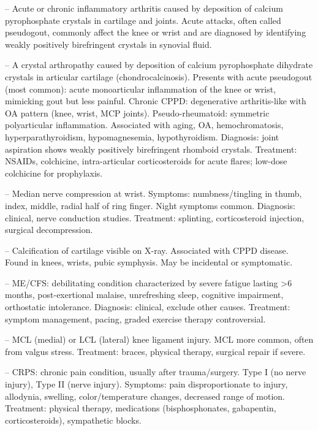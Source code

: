 -- Acute or chronic inflammatory arthritis caused by deposition of calcium pyrophosphate crystals in cartilage and joints. Acute attacks, often called pseudogout, commonly affect the knee or wrist and are diagnosed by identifying weakly positively birefringent crystals in synovial fluid.

-- A crystal arthropathy caused by deposition of calcium pyrophosphate dihydrate crystals in articular cartilage (chondrocalcinosis). Presents with acute pseudogout (most common): acute monoarticular inflammation of the knee or wrist, mimicking gout but less painful. Chronic CPPD: degenerative arthritis-like with OA pattern (knee, wrist, MCP joints). Pseudo-rheumatoid: symmetric polyarticular inflammation. Associated with aging, OA, hemochromatosis, hyperparathyroidism, hypomagnesemia, hypothyroidism. Diagnosis: joint aspiration shows weakly positively birefringent rhomboid crystals. Treatment: NSAIDs, colchicine, intra-articular corticosteroids for acute flares; low-dose colchicine for prophylaxis.

-- Median nerve compression at wrist. Symptoms: numbness/tingling in thumb, index, middle, radial half of ring finger. Night symptoms common. Diagnosis: clinical, nerve conduction studies. Treatment: splinting, corticosteroid injection, surgical decompression.

-- Calcification of cartilage visible on X-ray. Associated with CPPD disease. Found in knees, wrists, pubic symphysis. May be incidental or symptomatic.

-- ME/CFS: debilitating condition characterized by severe fatigue lasting >6 months, post-exertional malaise, unrefreshing sleep, cognitive impairment, orthostatic intolerance. Diagnosis: clinical, exclude other causes. Treatment: symptom management, pacing, graded exercise therapy controversial.

-- MCL (medial) or LCL (lateral) knee ligament injury. MCL more common, often from valgus stress. Treatment: braces, physical therapy, surgical repair if severe.

-- CRPS: chronic pain condition, usually after trauma/surgery. Type I (no nerve injury), Type II (nerve injury). Symptoms: pain disproportionate to injury, allodynia, swelling, color/temperature changes, decreased range of motion. Treatment: physical therapy, medications (bisphosphonates, gabapentin, corticosteroids), sympathetic blocks.

